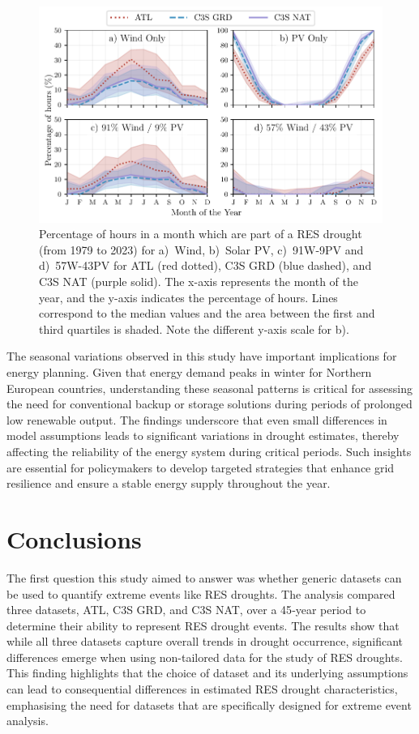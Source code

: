 \documentclass[preprint, 12pt]{elsarticle}
\begin{document}
\begin{figure}[!ht]
	\centering
	\includegraphics[width=\textwidth]{droughts_seasonality.pdf}
	\caption{Percentage of hours in a month which are part of a RES drought (from 1979 to 2023) for a)~Wind, b)~Solar PV, c)~91W-9PV and d)~57W-43PV for ATL (red dotted), C3S GRD (blue dashed), and C3S NAT (purple solid). The x-axis represents the month of the year, and the y-axis indicates the percentage of hours. Lines correspond to the median values and the area between the first and third quartiles is shaded. Note the different y-axis scale for b).}
	\label{fig:res_droughts_seasonality}
\end{figure}

The seasonal variations observed in this study have important implications for energy planning. Given that energy demand peaks in winter for Northern European countries, understanding these seasonal patterns is critical for assessing the need for conventional backup or storage solutions during periods of prolonged low renewable output. The findings underscore that even small differences in model assumptions leads to significant variations in drought estimates, thereby affecting the reliability of the energy system during critical periods. Such insights are essential for policymakers to develop targeted strategies that enhance grid resilience and ensure a stable energy supply throughout the year.


\section{Conclusions}
\label{sec:conclusions}

The first question this study aimed to answer was whether generic datasets can be used to quantify extreme events like RES droughts. The analysis compared three datasets, ATL, C3S GRD, and C3S NAT, over a 45‐year period to determine their ability to represent RES drought events. The results show that while all three datasets capture overall trends in drought occurrence, significant differences emerge when using non-tailored data for the study of RES droughts. This finding highlights that the choice of dataset and its underlying assumptions can lead to consequential differences in estimated RES drought characteristics, emphasising the need for datasets that are specifically designed for extreme event analysis.
\end{document}
